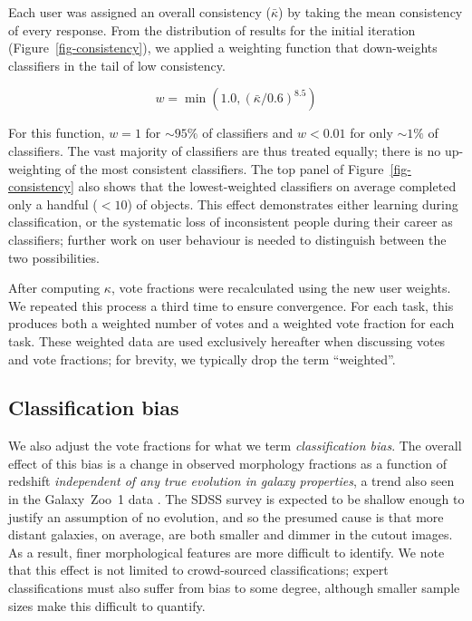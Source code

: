 \documentclass[useAMS,usenatbib]{mn2e}
\begin{document}
Each user was assigned an overall consistency ($\bar{\kappa}$) by taking the mean consistency of every response. From the distribution of results for the initial iteration (Figure~\ref{fig-consistency}), we applied a weighting function that down-weights classifiers in the tail of low consistency.

\begin{equation}
w = \min \left(1.0,(\bar{\kappa} / 0.6)^{8.5} \right)
\label{eqn-weight}
\end{equation}

\noindent For this function, $w=1$ for $\sim95\%$ of classifiers and $w<0.01$ for only $\sim1\%$ of classifiers. The vast majority of classifiers are thus treated equally; there is no up-weighting of the most consistent classifiers. The top panel of Figure~\ref{fig-consistency} also shows that the lowest-weighted classifiers on average completed only a handful ($<10$) of objects. This effect demonstrates either learning during classification, or the systematic loss of inconsistent people during their career as classifiers; further work on user behaviour is needed to distinguish between the two possibilities.

After computing $\kappa$, vote fractions were recalculated using the new user weights. We repeated this process a third time to ensure convergence. For each task, this produces both a weighted number of votes and a weighted vote fraction for each task. These weighted data are used exclusively hereafter when discussing votes and vote fractions; for brevity, we typically drop the term ``weighted''. 

\subsection{Classification bias}\label{ssec-classificationbias}

We also adjust the vote fractions for what we term {\it classification bias}. The overall effect of this bias is a change in observed morphology fractions as a function of redshift {\em independent of any true evolution in galaxy properties}, a trend also seen in the Galaxy~Zoo~1 data \citep{bam09}. The SDSS survey is expected to be shallow enough to justify an assumption of no evolution, and so the presumed cause is that more distant galaxies, on average, are both smaller and dimmer in the cutout images. As a result, finer morphological features are more difficult to identify. We note that this effect is not limited to crowd-sourced classifications; expert classifications must also suffer from bias to some degree, although smaller sample sizes make this difficult to quantify. 
\end{document}
